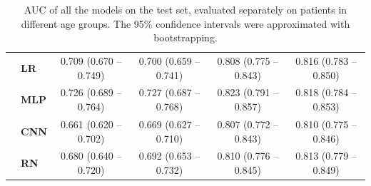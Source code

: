 \documentclass[preprint]{elsarticle}
\begin{document}
\begin{table}[H]
\begin{adjustbox}{center}
\begin{tabular}{@{}llcccc@{}}
& \textbf{LR} & 0.709 (0.670 -- 0.749) & 0.700 (0.659 -- 0.741) & 0.808 (0.775 -- 0.843) & 0.816 (0.783 -- 0.850) \\
& \textbf{MLP} & 0.726 (0.689 -- 0.764) & 0.727 (0.687 -- 0.768) & 0.823 (0.791 -- 0.857) & 0.818 (0.784 -- 0.853) \\
& \textbf{CNN} & 0.661 (0.620 -- 0.702) & 0.669 (0.627 -- 0.710) & 0.807 (0.772 -- 0.843) & 0.810 (0.775 -- 0.846) \\
& \textbf{RN} & 0.680 (0.640 -- 0.720) & 0.692 (0.653 -- 0.732) & 0.810 (0.776 -- 0.845) & 0.813 (0.779 -- 0.849) \\

\bottomrule
\end{tabular}
\end{adjustbox}
\caption{AUC of all the models on the test set, evaluated separately on patients in different age groups. The 95\% confidence intervals were approximated with bootstrapping.}
\label{table:appendix:age}
\end{table}
\renewcommand{\arraystretch}{1}
\end{document}
